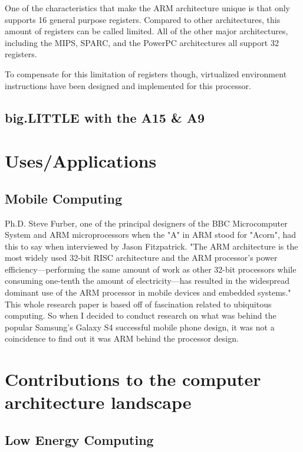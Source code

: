 \documentclass[12pt]{scrreprt}
\begin{document}
	One of the characteristics that make the ARM architecture unique is that only supports 16 general purpose registers. Compared to other architectures, this amount of registers can be called limited. All of the other major architectures, including the MIPS, SPARC, and the PowerPC architectures all support 32 registers. \iffalse Find a way to say how Itanium has 128 registers. the Itanium RISC architecture supports 128 registers! \fi

	To compensate for this limitation of registers though, virtualized environment instructions have been designed and implemented for this 
	processor.

	\section{big.LITTLE with the A15 \& A9}

\chapter{Uses/Applications}

	\section{Mobile Computing}

	Ph.D. Steve Furber, one of the principal designers of the BBC Microcomputer System and ARM microprocessors when the "A" in ARM stood for 
	"Acorn", had this to say when interviewed by Jason Fitzpatrick. "The ARM architecture is the most widely used 32-bit RISC architecture and the ARM processor's power efficiency—performing the same amount of work as other 32-bit processors while consuming one-tenth the amount of electricity—has resulted in the widespread dominant use of the ARM processor in mobile devices and embedded systems." This whole research paper is based off of fascination related to ubiquitous computing. So when I decided to conduct research on what was behind the popular Samsung's Galaxy S4 successful mobile phone design, it was not a coincidence to find out it was ARM behind the processor design.


\chapter{Contributions to the computer architecture landscape}

	\section{Low Energy Computing}
\end{document}
